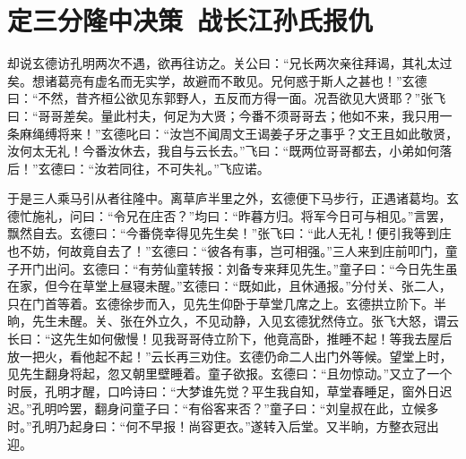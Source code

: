 \chapter{定三分隆中决策~战长江孙氏报仇}

却说玄德访孔明两次不遇，欲再往访之。关公曰：“兄长两次亲往拜谒，其礼太过矣。想诸葛亮有虚名而无实学，故避而不敢见。兄何惑于斯人之甚也！”玄德曰：“不然，昔齐桓公欲见东郭野人，五反而方得一面。况吾欲见大贤耶？”张飞曰：“哥哥差矣。量此村夫，何足为大贤；今番不须哥哥去；他如不来，我只用一条麻绳缚将来！”玄德叱曰：“汝岂不闻周文王谒姜子牙之事乎？文王且如此敬贤，汝何太无礼！今番汝休去，我自与云长去。”飞曰：“既两位哥哥都去，小弟如何落后！”玄德曰：“汝若同往，不可失礼。”飞应诺。

于是三人乘马引从者往隆中。离草庐半里之外，玄德便下马步行，正遇诸葛均。玄德忙施礼，问曰：“令兄在庄否？”均曰：“昨暮方归。将军今日可与相见。”言罢，飘然自去。玄德曰：“今番侥幸得见先生矣！”张飞曰：“此人无礼！便引我等到庄也不妨，何故竟自去了！”玄德曰：“彼各有事，岂可相强。”三人来到庄前叩门，童子开门出问。玄德曰：“有劳仙童转报：刘备专来拜见先生。”童子曰：“今日先生虽在家，但今在草堂上昼寝未醒。”玄德曰：“既如此，且休通报。”分付关、张二人，只在门首等着。玄德徐步而入，见先生仰卧于草堂几席之上。玄德拱立阶下。半晌，先生未醒。关、张在外立久，不见动静，入见玄德犹然侍立。张飞大怒，谓云长曰：“这先生如何傲慢！见我哥哥侍立阶下，他竟高卧，推睡不起！等我去屋后放一把火，看他起不起！”云长再三劝住。玄德仍命二人出门外等候。望堂上时，见先生翻身将起，忽又朝里壁睡着。童子欲报。玄德曰：“且勿惊动。”又立了一个时辰，孔明才醒，口吟诗曰：“大梦谁先觉？平生我自知，草堂春睡足，窗外日迟迟。”孔明吟罢，翻身问童子曰：“有俗客来否？”童子曰：“刘皇叔在此，立候多时。”孔明乃起身曰：“何不早报！尚容更衣。”遂转入后堂。又半晌，方整衣冠出迎。

